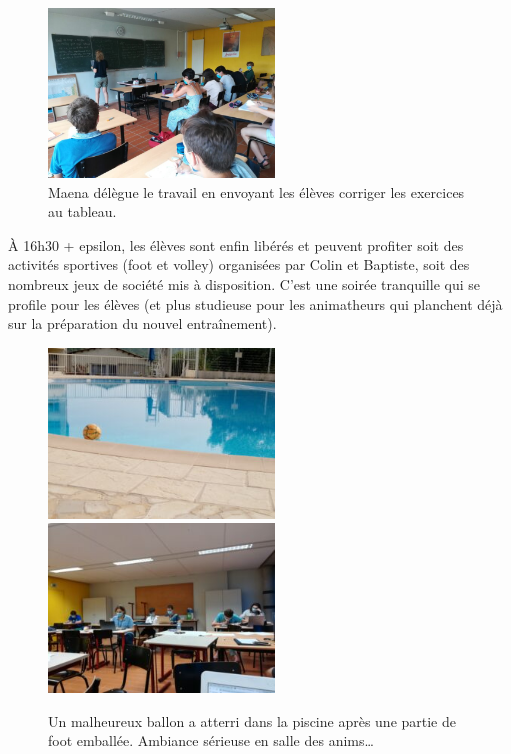 \begin{figure}[H]
\centering\includegraphics[width=6cm]{CR-22-2.jpg}
\caption{Maena délègue le travail en envoyant les élèves corriger les exercices au tableau.}
\end{figure}

À 16h30 + epsilon, les élèves sont enfin libérés et peuvent profiter soit des activités sportives (foot et volley) organisées par Colin et Baptiste, soit des nombreux jeux de société mis à disposition. C’est une soirée tranquille qui se profile pour les élèves (et plus studieuse pour les animatheurs qui planchent déjà sur la préparation du nouvel entraînement).

\begin{figure}[H]
\centering\includegraphics[width=6cm]{CR-22-3.jpg}\hspace{2cm}\includegraphics[width=6cm]{CR-22-4.jpg}
\caption{Un malheureux ballon a atterri dans la piscine après une partie de foot emballée. Ambiance sérieuse en salle des anims…}
\end{figure}